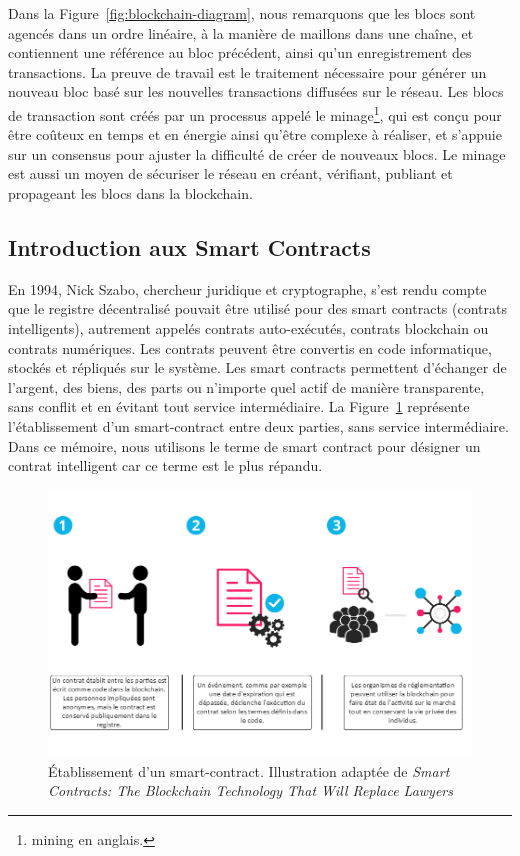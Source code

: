 \documentclass{tnreport}
\begin{document}
Dans la Figure~\ref{fig:blockchain-diagram}, nous remarquons que les blocs sont agencés dans un ordre linéaire, à la manière de maillons dans une chaîne, et contiennent une référence au bloc précédent, ainsi qu'un enregistrement des transactions.
La preuve de travail est le traitement nécessaire pour générer un nouveau bloc basé sur les nouvelles transactions diffusées sur le réseau.
Les blocs de transaction sont créés par un processus appelé le minage\footnote{mining en anglais.}, qui est conçu pour être coûteux en temps et en énergie ainsi qu'être complexe à réaliser, et s'appuie sur un consensus pour ajuster la difficulté de créer de nouveaux blocs. Le minage est aussi un moyen de sécuriser le réseau en créant, vérifiant, publiant et propageant les blocs dans la blockchain.

\subsection{Introduction aux Smart Contracts}

En 1994, Nick Szabo, chercheur juridique et cryptographe, s'est rendu compte que le registre décentralisé pouvait être utilisé pour des smart contracts (contrats intelligents), autrement appelés contrats auto-exécutés, contrats blockchain ou contrats numériques.
Les contrats peuvent être convertis en code informatique, stockés et répliqués sur le système.
Les smart contracts permettent d'échanger de l'argent, des biens, des parts ou n'importe quel actif de manière transparente, sans conflit et en évitant tout service intermédiaire.
La Figure~\ref{fig:smart-contracts} représente l'établissement d'un smart-contract entre deux parties, sans service intermédiaire. Dans ce mémoire, nous utilisons le terme de smart contract pour désigner un contrat intelligent car ce terme est le plus répandu.

\begin{figure}[h]
	\centering
	\includegraphics[scale=0.53]{figures/smart-contracts}
	\caption{Établissement d'un smart-contract. Illustration adaptée de \textit{Smart Contracts: The Blockchain Technology That Will Replace Lawyers}~\cite{smart-contracts}}
	\label{fig:smart-contracts}
\end{figure}
\end{document}
